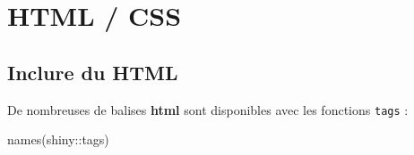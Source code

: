 \documentclass[
]{article}
\newenvironment{Shaded}{\begin{snugshade}}{\end{snugshade}}
\newcommand{\FunctionTok}[1]{\textcolor[rgb]{0.00,0.00,0.00}{#1}}
\newcommand{\NormalTok}[1]{#1}
\newcommand{\SpecialCharTok}[1]{\textcolor[rgb]{0.00,0.00,0.00}{#1}}
\begin{document}
\hypertarget{html-css}{%
\section{HTML / CSS}\label{html-css}}

\hypertarget{inclure-du-html}{%
\subsection{Inclure du HTML}\label{inclure-du-html}}

De nombreuses de balises \textbf{html} sont disponibles avec les
fonctions \texttt{tags} :

\begin{Shaded}
\begin{Highlighting}[]
\FunctionTok{names}\NormalTok{(shiny}\SpecialCharTok{::}\NormalTok{tags)}
\end{Highlighting}
\end{Shaded}
\end{document}
